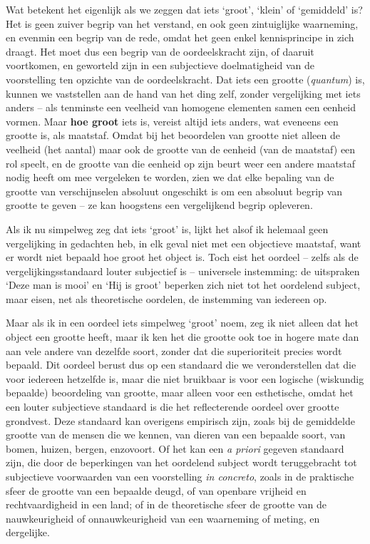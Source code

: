 Wat betekent het eigenlijk als we zeggen dat iets ‘groot’, ‘klein’ of ‘gemiddeld’ is? Het is geen zuiver begrip van het verstand, en ook geen zintuiglijke waarneming, en evenmin een begrip van de rede, omdat het geen enkel kennisprincipe in zich draagt. Het moet dus een begrip van de oordeelskracht zijn, of daaruit voortkomen, en geworteld zijn in een subjectieve doelmatigheid van de voorstelling ten opzichte van de oordeelskracht.
Dat iets een grootte (\textit{quantum}) is, kunnen we vaststellen aan de hand van het ding zelf, zonder vergelijking met iets anders – als tenminste een veelheid van homogene elementen samen een eenheid vormen. Maar \textbf{hoe groot} iets is, vereist altijd iets anders, wat eveneens een grootte is, als maatstaf. Omdat bij het beoordelen van grootte niet alleen de veelheid (het aantal) maar ook de grootte van de eenheid (van de maatstaf) een rol speelt, en de grootte van die eenheid op zijn beurt weer een andere maatstaf nodig heeft om mee vergeleken te worden, zien we dat elke bepaling van de grootte van verschijnselen absoluut ongeschikt is om een absoluut begrip van grootte te geven – ze kan hoogstens een vergelijkend begrip opleveren.

Als ik nu simpelweg zeg dat iets ‘groot’ is, lijkt het alsof ik helemaal geen vergelijking in gedachten heb, in elk geval niet met een objectieve maatstaf, want er wordt niet bepaald hoe groot het object is. Toch eist het oordeel – zelfs als de vergelijkingsstandaard louter subjectief is – universele instemming: de uitspraken ‘Deze man is mooi’ en ‘Hij is groot’ beperken zich niet tot het oordelend subject, maar eisen, net als theoretische oordelen, de instemming van iedereen op.

Maar als ik in een oordeel iets simpelweg ‘groot’ noem, zeg ik niet alleen dat het object een grootte heeft, maar ik ken het die grootte ook toe in hogere mate dan aan vele andere van dezelfde soort, zonder dat die superioriteit precies wordt bepaald. Dit oordeel berust dus op een standaard die we veronderstellen dat die voor iedereen hetzelfde is, maar die niet bruikbaar is voor een logische (wiskundig bepaalde) beoordeling van grootte, maar alleen voor een esthetische, omdat het een louter subjectieve standaard is die het reflecterende oordeel over grootte grondvest.
Deze standaard kan overigens empirisch zijn, zoals bij de gemiddelde grootte van de mensen die we kennen, van dieren van een bepaalde soort, van bomen, huizen, bergen, enzovoort. Of het kan een \textit{a priori} gegeven standaard zijn, die door de beperkingen van het oordelend subject wordt teruggebracht tot subjectieve voorwaarden van een voorstelling \textit{in concreto}, zoals in de praktische sfeer de grootte van een bepaalde deugd, of van openbare vrijheid en rechtvaardigheid in een land; of in de theoretische sfeer de grootte van de nauwkeurigheid of onnauwkeurigheid van een waarneming of meting, en dergelijke.


